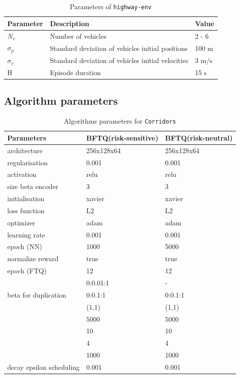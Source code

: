 \begin{table}[ht!]
    \centering
    \begin{tabularx}{1.0\textwidth}{lll}
        \toprule
        Parameter & Description & Value\tabularnewline
        \midrule
        $N_v$& Number of vehicles & 2 - 6\tabularnewline
        $\sigma_p$& Standard deviation of vehicles initial positions & 100 m\tabularnewline
        $\sigma_v$& Standard deviation of vehicles initial velocities & 3 m/s\tabularnewline
        H & Episode duration & 15 s\tabularnewline
        \bottomrule
    \end{tabularx}

    \caption{Parameters of \texttt{highway-env}}
\end{table}

\subsection{Algorithm parameters}
\label{sec:algorithms-parameters}

\begin{table}[H]
    \centering
    \begin{tabularx}{1.0\textwidth}{lll}
        \toprule
        Parameters & BFTQ(risk-sensitive) & BFTQ(risk-neutral)\tabularnewline
        \midrule
        architecture & 256x128x64 & 256x128x64\tabularnewline
        regularisation & 0.001 & 0.001\tabularnewline
        activation & relu & relu\tabularnewline
        size beta encoder & 3 & 3\tabularnewline
        initialisation & xavier & xavier\tabularnewline
        loss function & L2 & L2\tabularnewline
        optimizer & adam & adam\tabularnewline
        learning rate & 0.001 & 0.001\tabularnewline
        epoch (NN) & 1000 & 5000\tabularnewline
        normalize reward & true & true\tabularnewline
        epoch (FTQ) & 12 & 12\tabularnewline
        & 0:0.01:1 & -\tabularnewline
        beta for duplication & 0:0.1:1 & 0:0.1:1\tabularnewline
        & (1,1) & (1,1)\tabularnewline
        & 5000 & 5000\tabularnewline
        & 10 & 10\tabularnewline
        & 4 & 4\tabularnewline
        & 1000 & 1000\tabularnewline
        decay epsilon scheduling & 0.001 & 0.001\tabularnewline
        \bottomrule

    \end{tabularx}
    \caption{Algorithms parameters for \texttt{Corridors}}
\end{table}

